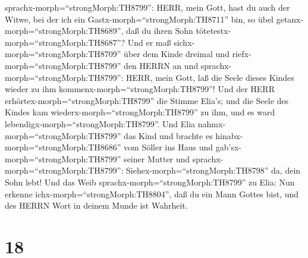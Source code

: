 sprachx-morph=``strongMorph:TH8799'': HERR, mein Gott, hast du auch der
Witwe, bei der ich ein Gastx-morph=``strongMorph:TH8711'' bin, so übel
getanx-morph=``strongMorph:TH8689'', daß du ihren Sohn
tötetestx-morph=``strongMorph:TH8687''?  Und er maß
sichx-morph=``strongMorph:TH8709'' über dem Kinde dreimal und
riefx-morph=``strongMorph:TH8799'' den HERRN an und
sprachx-morph=``strongMorph:TH8799'': HERR, mein Gott, laß die Seele
dieses Kindes wieder zu ihm kommenx-morph=``strongMorph:TH8799''!
 Und der HERR erhörtex-morph=``strongMorph:TH8799'' die
Stimme Elia's; und die Seele des Kindes kam
wiederx-morph=``strongMorph:TH8799'' zu ihm, und es ward
lebendigx-morph=``strongMorph:TH8799''.  Und Elia
nahmx-morph=``strongMorph:TH8799'' das Kind und brachte es
hinabx-morph=``strongMorph:TH8686'' vom Söller ins Haus und
gab'sx-morph=``strongMorph:TH8799'' seiner Mutter und
sprachx-morph=``strongMorph:TH8799'':
Siehex-morph=``strongMorph:TH8798'' da, dein Sohn lebt! 
Und das Weib sprachx-morph=``strongMorph:TH8799'' zu Elia: Nun erkenne
ichx-morph=``strongMorph:TH8804'', daß du ein Mann Gottes bist, und des
HERRN Wort in deinem Munde ist Wahrheit.

\hypertarget{section-17}{%
\section{18}\label{section-17}}

